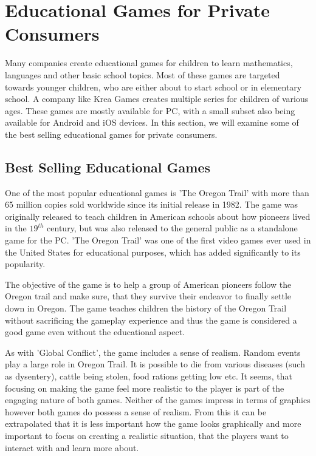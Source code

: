 \section{Educational Games for Private Consumers}
\label{sec:privateconsumers}
Many companies create educational games for children to learn mathematics, languages and other basic school topics.
Most of these games are targeted towards younger children, who are either about to start school or in elementary school.
A company like Krea Games creates multiple series for children of various ages.\cite{kreagames}
These games are mostly available for PC, with a small subset also being available for Android and iOS devices.
In this section, we will examine some of the best selling educational games for private consumers.

\subsection{Best Selling Educational Games}
One of the most popular educational games is 'The Oregon Trail' with more than 65 million copies sold worldwide since its initial release in 1982.\cite{oregontrail}
The game was originally released to teach children in American schools about how pioneers lived in the $19^{th}$ century, but was also released to the general public as a standalone game for the PC. 'The Oregon Trail' was one of the first video games ever used in the United States for educational purposes, which has added significantly to its popularity.

The objective of the game is to help a group of American pioneers follow the Oregon trail and make sure, that they survive their endeavor to finally settle down in Oregon. The game teaches children the history of the Oregon Trail without sacrificing the gameplay experience and thus the game is considered a good game even without the educational aspect.\newline

As with 'Global Conflict', the game includes a sense of realism.
Random events play a large role in Oregon Trail.
It is possible to die from various diseases (such as dysentery), cattle being stolen, food rations getting low etc.
It seems, that focusing on making the game feel more realistic to the player is part of the engaging nature of both games.
Neither of the games impress in terms of graphics however both games do possess a sense of realism. From this it can be extrapolated that it is less important how the game looks graphically and more important to focus on creating a realistic situation, that the players want to interact with and learn more about.\newline

